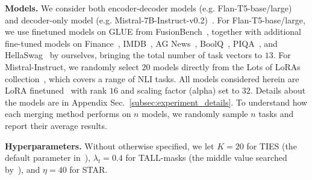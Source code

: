 \noindent\textbf{Models.} We consider both encoder-decoder models (e.g. Flan-T5-base/large)~\cite{chung2024scaling} and decoder-only model (e.g. Mistral-7B-Instruct-v0.2)~\cite{jiang2023mistral}.
For Flan-T5-base/large, we use finetuned models on GLUE from FusionBench~\cite{tang2024fusionbench}, 
together with additional fine-tuned models on Finance~\cite{Malo2014GoodDO}, IMDB~\cite{maas-EtAl:2011:ACL-HLT2011}, AG News~\cite{zhang2015character}, BoolQ~\cite{clark2019boolq}, PIQA~\cite{Bisk2020}, and HellaSwag~\cite{zellers2019hellaswag} by ourselves, bringing the total number of task vectors to \(13\). For Mistral-Instruct, we randomly select \(20\) models directly from the Lots of LoRAs collection~\cite{bruel2024compress}, which covers a range of NLI tasks.
All models considered herein are LoRA finetuned~\cite{hu2021lora} with rank \(16\) and scaling factor (alpha) set to \(32\). Details about the models are in Appendix Sec.~\ref{subsec:experiment_details}.
To understand how each merging method performs on $n$ models, we randomly sample $n$ tasks and report their average results. 

\noindent\textbf{Hyperparameters.} Without otherwise specified, we let $K=20$ for TIES (the default parameter in~\cite{yadav2024ties}), \(\lambda_{t}=0.4\) for TALL-masks (the middle value searched by~\cite{wang2024localizing}), and \(\eta=40\) for STAR. 

